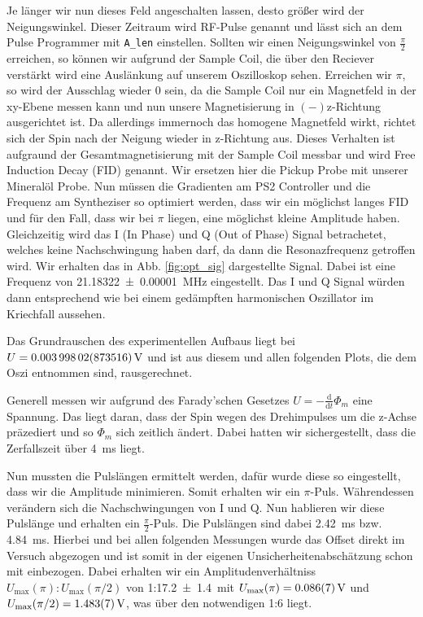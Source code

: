 \documentclass[10pt]{article}
\newenvironment{Figure}
  {\par\medskip\noindent\minipage{\linewidth}}
  {\endminipage\par\medskip}
\begin{document}
\begin{multicols}{2}
Je länger wir nun dieses Feld angeschalten lassen, desto größer wird der Neigungswinkel. Dieser Zeitraum wird RF-Pulse genannt und lässt sich an dem Pulse Programmer mit \texttt{A_len} einstellen. Sollten wir einen Neigungswinkel von $\frac{\pi}{2}$ erreichen, so können wir aufgrund der Sample Coil, die über den Reciever verstärkt wird eine Auslänkung auf unserem Oszilloskop sehen. Erreichen wir $\pi$, so wird der Ausschlag wieder 0 sein, da die Sample Coil nur ein Magnetfeld in der xy-Ebene messen kann und nun unsere Magnetisierung in $(-)$z-Richtung ausgerichtet ist. Da allerdings immernoch das homogene Magnetfeld wirkt, richtet sich der Spin nach der Neigung wieder in z-Richtung aus. Dieses Verhalten ist aufgraund der Gesamtmagnetisierung mit der Sample Coil messbar und wird Free Induction Decay (FID) genannt. Wir ersetzen hier die Pickup Probe mit unserer Mineralöl Probe. Nun müssen die Gradienten am PS2 Controller und die Frequenz am Syntheziser so optimiert werden, dass wir ein möglichst langes FID und für den Fall, dass wir bei $\pi$ liegen, eine möglichst kleine Amplitude haben. Gleichzeitig wird das I (In Phase) und Q (Out of Phase) Signal betrachetet, welches keine Nachschwingung haben darf, da dann die Resonazfrequenz getroffen wird. Wir erhalten das in Abb. \ref{fig:opt_sig} dargestellte Signal. Dabei ist eine Frequenz von \SI{21.18322+-0.00001}{\mega Hz} eingestellt. Das I und Q Signal würden dann entsprechend wie bei einem gedämpften harmonischen Oszillator im Kriechfall aussehen.
  \begin{Figure}
    \centering\resizebox{\textwidth}{!}{}
    \label{fig:opt_sig}
  \end{Figure}
Das Grundrauschen des experimentellen Aufbaus liegt bei $U=\SI{0.00399802+-0.00873516}{V}$ und ist aus diesem und allen folgenden Plots, die dem Oszi entnommen sind, rausgerechnet.

Generell messen wir aufgrund des Farady'schen Gesetzes $U=-\frac{\text{d}}{\text{d}t}\Phi_m$ eine Spannung. Das liegt daran, dass der Spin wegen des Drehimpulses um die z-Achse präzediert und so $\Phi_m$ sich zeitlich ändert. Dabei hatten wir sichergestellt, dass die Zerfallszeit über \SI{4}{\milli s} liegt.

  Nun mussten die Pulslängen ermittelt werden, dafür wurde diese so eingestellt, dass wir die Amplitude minimieren. Somit erhalten wir ein $\pi$-Puls. Währendessen verändern sich die Nachschwingungen von I und Q. Nun hablieren wir diese Pulslänge und erhalten ein $\frac{\pi}{2}$-Puls. Die Pulslängen sind dabei \SI{2.42}{\milli s} bzw. \SI{4.84}{\milli s}. Hierbei und bei allen folgenden Messungen wurde das Offset direkt im Versuch abgezogen und ist somit in der eigenen Unsicherheitenabschätzung schon mit einbezogen. Dabei erhalten wir ein Amplitudenverhältniss $U_{\text{max}}(\pi):U_{\text{max}}(\pi/2)$ von 1:\SI{17.2+-1.4} mit $U_{\text{max}}(\pi)=\SI{0.086+-0.007}{V}$ und $U_{\text{max}}(\pi/2)=\SI{1.483+-0.007}{V}$, was über den notwendigen 1:6 liegt.



\end{multicols}
\end{document}
